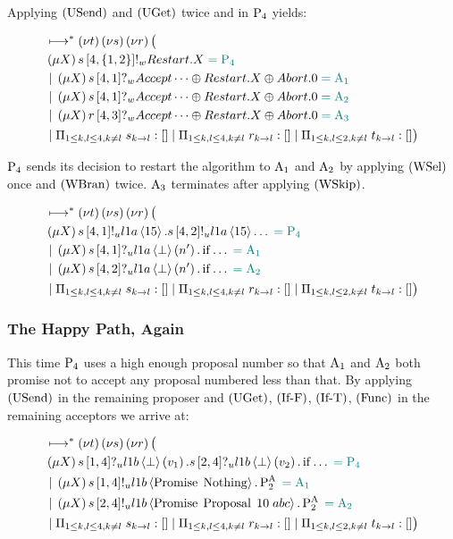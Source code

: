 Applying $\RUsend$ and $\RUget$ twice and \RIfT in $\Proposer{4}$ yields:

\begin{align*}
&\mapstostar \NuChannels \big (\\
&\Mu{X} \SendWeaklyP{s}{4}{\Curly{1,2}}{\Restart}{X} \comment{= \Proposer{4}}\\
&\Or \Mu{X} \ReceiveWeaklyP{s}{4}{1}{\BeginPaCont} \comment{= \Acceptor{1}}\\
&\Or \Mu{X} \ReceiveWeaklyP{s}{4}{1}{\BeginPaCont} \comment{= \Acceptor{2}}\\
&\Or \Mu{X} \ReceiveWeaklyP{r}{4}{3}{\BeginPaCont} \comment{= \Acceptor{3}}\\
&\Or \InnerSessionQueues{s}
\Or \InnerSessionQueues{r}
\Or \OuterSessionQueues
\big )
\end{align*}

$\Proposer{4}$ sends its decision to restart the algorithm to $\Acceptor{1}$ and $\Acceptor{2}$ by applying $\RWsel$ once and $\RWbran$ twice.
$\Acceptor{3}$ terminates after applying $\RWskip$.

\begin{align*}
&\mapstostar \NuChannels \big (\\
&\Mu{X} \SendUnreliableP{s}{4}{1}{\LOneA}{15}.\SendUnreliableP{s}{4}{2}{\LOneA}{15}\dots \comment{= \Proposer{4}}\\
&\Or \Mu{X} \ReceiveUnreliableP{s}{4}{1}{\LOneA}{\bot}{n'}.\If{\dots} \comment{= \Acceptor{1}}\\
&\Or \Mu{X} \ReceiveUnreliableP{s}{4}{2}{\LOneA}{\bot}{n'}.\If{\dots} \comment{= \Acceptor{2}}\\
&\Or \InnerSessionQueues{s}
\Or \InnerSessionQueues{r}
\Or \OuterSessionQueues
\big )
\end{align*}

\subsubsection{The Happy Path, Again}

This time $\Proposer{4}$ uses a high enough proposal number so that $\Acceptor{1}$ and $\Acceptor{2}$ both promise not to accept any proposal numbered less than that.
By applying $\RUsend$ in the remaining proposer and $\RUget$, $\RIfF$, $\RIfT$, $\RSideEffect$ in the remaining acceptors we arrive at:

\begin{align*}
&\mapstostar \NuChannels \big (\\
&\Mu{X} \ReceiveUnreliableP{s}{1}{4}{\LOneB}{\bot}{v_1}.\ReceiveUnreliableP{s}{2}{4}{\LOneB}{\bot}{v_2}.\If{\dots} \comment{= \Proposer{4}}\\
&\Or \Mu{X} \SendUnreliableP{s}{1}{4}{\LOneB}{\Promise{\Nothing}}.\PaTwo \comment{= \Acceptor{1}}\\
&\Or \Mu{X} \SendUnreliableP{s}{2}{4}{\LOneB}{\Promise{\ProposalC{10}{abc}}}.\PaTwo \comment{= \Acceptor{2}}\\
&\Or \InnerSessionQueues{s}
\Or \InnerSessionQueues{r}
\Or \OuterSessionQueues
\big )
\end{align*}

